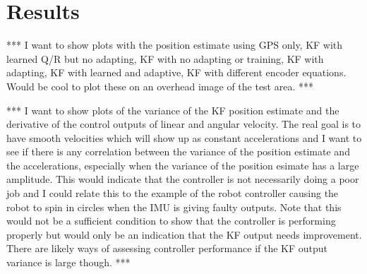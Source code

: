 \chapter{Results}
\label{ch:results}
*** I want to show plots with the position estimate using GPS only, KF with learned Q/R but no adapting, KF with no adapting or training, KF with adapting, KF with learned and adaptive, KF with different encoder equations. Would be cool to plot these on an overhead image of the test area. ***

*** I want to show plots of the variance of the KF position estimate and the derivative of the control outputs of linear and angular velocity. The real goal is to have smooth velocities which will show up as constant accelerations and I want to see if there is any correlation between the variance of the position estimate and the accelerations, especially when the variance of the position esimate has a large amplitude. This would indicate that the controller is not necessarily doing a poor job and I could relate this to the example of the robot controller causing the robot to spin in circles when the IMU is giving faulty outputs. Note that this would not be a sufficient condition to show that the controller is performing properly but would only be an indication that the KF output needs improvement. There are likely ways of assessing controller performance if the KF output variance is large though. ***